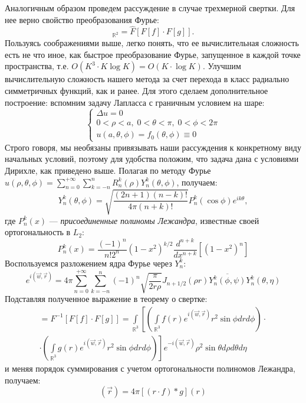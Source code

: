 Аналогичным образом проведем рассуждение в случае трехмерной свертки. Для нее верно свойство преобразования Фурье: 
\begin{equation*}
[f*g]_{\mathbb{R}^{2}}=\hat{F}[F[f]\cdot F[g]].
\end{equation*}
Пользуясь соображениями выше, легко понять, что ее вычислительная сложность есть не что иное, как быстрое преобразование Фурье, запущенное в каждой точке пространства, т.е. $ O(K^{3}\cdot K\log K)=O(K\cdot\log K) $. Улучшим вычислительную сложность нашего метода за счет перехода в класс радиально симметричных функций, как и ранее. Для этого сделаем дополнительное построение: вспомним задачу Лапласса с граничным условием на шаре:
\begin{equation*}
\begin{cases}
	\Delta u=0\\
	0<\rho<a,\;0<\theta<\pi,\;0<\phi<2\pi\\
	u(a,\theta,\phi)=f_{0}(\theta,\phi)\equiv0
\end{cases}
\end{equation*}
Строго говоря, мы необязаны привязывать наши рассуждения к конкретному виду начальных условий, поэтому для удобства положим, что задача дана с условиями Дирихле, как приведено выше. Полагая по методу Фурье $ u(\rho,\theta,\phi)=\sum\limits _{n=0}^{+\infty}\sum\limits _{k=-n}^{n}R_{n}^{k}(\rho)Y_{n}^{k}(\theta,\phi) $, получаем: \begin{equation*}
Y_{n}^{k}(\theta,\phi)=\sqrt{\frac{(2n+1)(n-k)!}{4\pi(n+k)!}}P_{n}^{k}(\cos\phi)e^{ik\theta},
\end{equation*}
где $ P_{n}^{k}(x) $ --- \textit{присоединенные полиномы Лежандра}, известные своей ортогональность в $ L_{2} $: \begin{equation*}
P_{n}^{k}(x)=\frac{(-1)^{n}}{n!2^{n}}(1-x^{2})^{k/2}\frac{d^{n+k}}{dx^{n+k}}[(1-x^{2})^{n}]
\end{equation*}
Воспользуемся разложением ядра Фурье через $ Y_{n}^{k} $: \begin{equation*}
e^{i(\vec{w},\vec{r})}=4\pi\sum\limits _{n=0}^{+\infty}\sum\limits _{k=-n}^{n}(-1)^{n}\sqrt{\frac{\pi}{2r\rho}}J_{n+1/2}(\rho r)\overline{Y_{n}^{k}(\phi,\psi)}Y_{n}^{k}(\theta,\eta)
\end{equation*}
Подставляя полученное выражение в теорему о свертке:
\begin{multline*}
[f***g]=F^{-1}[ F[f]\cdot F[g] ]= \int\limits_{\mathbb{R}^3} \left[ \left( \int\limits_{\mathbb{R}^3} f(r) e^{i (\vec{w}, \vec{r})} r^2 \sin \phi dr d\phi \right) \cdot \right. \\
\left. \cdot \left( \int\limits_{\mathbb{R}^3} g(r) e^{i (\vec{w}, \vec{r})} r^2 \sin \phi dr d\phi \right) \right] e^{-i (\vec{w}, \vec{r})} \rho^2 \sin \theta d\rho d\theta d\eta
\end{multline*}
и меняя порядок суммирования с учетом ортогональности полиномов Лежандра, получаем: 
\begin{equation*}
[f***g](\vec{r})=4\pi[(r\cdot f)*g](r)
\end{equation*}